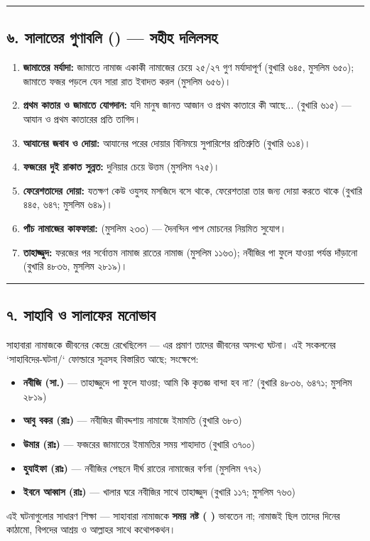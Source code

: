 \medskip\hrule\medskip

\subsection*{৬. সালাতের গুণাবলি () — সহীহ দলিলসহ}

\begin{enumerate}
\item \textbf{জামাতের মর্যাদা:} জামাতে নামাজ একাকী নামাজের চেয়ে ২৫/২৭ গুণ মর্যাদাপূর্ণ (বুখারি ৬৪৫, মুসলিম ৬৫০); জামাতে ফজর পড়লে যেন সারা রাত ইবাদত করল (মুসলিম ৬৫৬)।
\item \textbf{প্রথম কাতার ও জামাতে যোগদান:} যদি মানুষ জানত আজান ও প্রথম কাতারে কী আছে... (বুখারি ৬১৫) — আযান ও প্রথম কাতারের প্রতি তাগিদ।
\item \textbf{আযানের জবাব ও দোয়া:} আযানের পরের দোয়ার বিনিময়ে সুপারিশের প্রতিশ্রুতি (বুখারি ৬১৪)।
\item \textbf{ফজরের দুই রাকাত সুন্নত:} দুনিয়ার চেয়ে উত্তম (মুসলিম ৭২৫)।
\item \textbf{ফেরেশতাদের দোয়া:} যতক্ষণ কেউ ওযুসহ মসজিদে বসে থাকে, ফেরেশতারা তার জন্য দোয়া করতে থাকে (বুখারি ৪৪৫, ৬৪৭; মুসলিম ৬৪৯)।
\item \textbf{পাঁচ নামাজের কাফফারা:} (মুসলিম ২৩৩) — দৈনন্দিন পাপ মোচনের নিয়মিত সুযোগ।
\item \textbf{তাহাজ্জুদ:} ফরজের পর সর্বোত্তম নামাজ রাতের নামাজ (মুসলিম ১১৬৩); নবীজির পা ফুলে যাওয়া পর্যন্ত দাঁড়ানো (বুখারি ৪৮৩৬, মুসলিম ২৮১৯)।
\end{enumerate}
\medskip\hrule\medskip

\subsection*{৭. সাহাবি ও সালাফের মনোভাব}

সাহাবারা নামাজকে জীবনের কেন্দ্রে রেখেছিলেন — এর প্রমাণ তাদের জীবনের অসংখ্য ঘটনা। এই সংকলনের `সাহাবিদের-ঘটনা/` ফোল্ডারে সূত্রসহ বিস্তারিত আছে; সংক্ষেপে:

\begin{itemize}
\item \textbf{নবীজি (সা.)} — তাহাজ্জুদে পা ফুলে যাওয়া; আমি কি কৃতজ্ঞ বান্দা হব না? (বুখারি ৪৮৩৬, ৬৪৭১; মুসলিম ২৮১৯)
\item \textbf{আবু বকর (রাঃ)} — নবীজির জীবদ্দশায় নামাজে ইমামতি (বুখারি ৬৮৩)
\item \textbf{উমার (রাঃ)} — ফজরের জামাতের ইমামতির সময় শাহাদাত (বুখারি ৩৭০০)
\item \textbf{হুযাইফা (রাঃ)} — নবীজির পেছনে দীর্ঘ রাতের নামাজের বর্ণনা (মুসলিম ৭৭২)
\item \textbf{ইবনে আব্বাস (রাঃ)} — খালার ঘরে নবীজির সাথে তাহাজ্জুদ (বুখারি ১১৭; মুসলিম ৭৬৩)
\end{itemize}
এই ঘটনাগুলোর সাধারণ শিক্ষা — সাহাবারা নামাজকে \textbf{সময় নষ্ট (  )} ভাবতেন না; নামাজই ছিল তাদের দিনের কাঠামো, বিপদের আশ্রয় ও আল্লাহর সাথে কথোপকথন।


